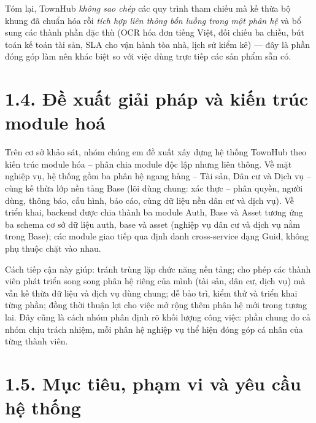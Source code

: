 \noindent Tóm lại, TownHub \emph{không sao chép} các quy trình tham chiếu mà kế thừa bộ khung đã chuẩn hóa rồi \emph{tích hợp liên thông bốn luồng trong một phân hệ} và bổ sung các thành phần đặc thù (OCR hóa đơn tiếng Việt, đối chiếu ba chiều, bút toán kế toán tài sản, SLA cho vận hành tòa nhà, lịch sử kiểm kê) — đây là phần đóng góp làm nên khác biệt so với việc dùng trực tiếp các sản phẩm sẵn có.

\section*{1.4. Đề xuất giải pháp và kiến trúc module hoá}
Trên cơ sở khảo sát, nhóm chúng em đề xuất xây dựng hệ thống TownHub theo kiến trúc module hóa – phân chia module độc lập nhưng liên thông. Về mặt nghiệp vụ, hệ thống gồm ba phân hệ ngang hàng – Tài sản, Dân cư và Dịch vụ – cùng kế thừa lớp nền tảng Base (lõi dùng chung: xác thực – phân quyền, người dùng, thông báo, cấu hình, báo cáo, cùng dữ liệu nền dân cư và dịch vụ). Về triển khai, backend được chia thành ba module Auth, Base và Asset tương ứng ba schema cơ sở dữ liệu auth, base và asset (nghiệp vụ dân cư và dịch vụ nằm trong Base); các module giao tiếp qua định danh cross-service dạng Guid, không phụ thuộc chặt vào nhau.

Cách tiếp cận này giúp: tránh trùng lặp chức năng nền tảng; cho phép các thành viên phát triển song song phân hệ riêng của mình (tài sản, dân cư, dịch vụ) mà vẫn kế thừa dữ liệu và dịch vụ dùng chung; dễ bảo trì, kiểm thử và triển khai từng phần; đồng thời thuận lợi cho việc mở rộng thêm phân hệ mới trong tương lai. Đây cũng là cách nhóm phân định rõ khối lượng công việc: phần chung do cả nhóm chịu trách nhiệm, mỗi phân hệ nghiệp vụ thể hiện đóng góp cá nhân của từng thành viên.

\section*{1.5. Mục tiêu, phạm vi và yêu cầu hệ thống}
